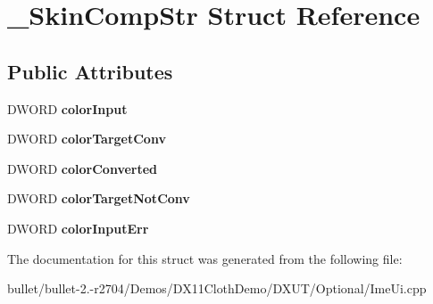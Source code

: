 \hypertarget{struct___skin_comp_str}{\section{\+\_\+\+Skin\+Comp\+Str Struct Reference}
\label{struct___skin_comp_str}
}
\subsection*{Public Attributes}
\begin{DoxyCompactItemize}
\item 
\hypertarget{struct___skin_comp_str_a329b3e3f5517a6d59e46ddea35e6174a}{D\+W\+O\+R\+D {\bfseries color\+Input}}\label{struct___skin_comp_str_a329b3e3f5517a6d59e46ddea35e6174a}

\item 
\hypertarget{struct___skin_comp_str_aa6aab6d6eb5106400d21ad0cf77f6399}{D\+W\+O\+R\+D {\bfseries color\+Target\+Conv}}\label{struct___skin_comp_str_aa6aab6d6eb5106400d21ad0cf77f6399}

\item 
\hypertarget{struct___skin_comp_str_a206bf9f56ec4c63506a61ef1cd640ecb}{D\+W\+O\+R\+D {\bfseries color\+Converted}}\label{struct___skin_comp_str_a206bf9f56ec4c63506a61ef1cd640ecb}

\item 
\hypertarget{struct___skin_comp_str_a8f57e646fcd03915f3b9af65a66c41a3}{D\+W\+O\+R\+D {\bfseries color\+Target\+Not\+Conv}}\label{struct___skin_comp_str_a8f57e646fcd03915f3b9af65a66c41a3}

\item 
\hypertarget{struct___skin_comp_str_a7112d201c275559375084f9529a743e3}{D\+W\+O\+R\+D {\bfseries color\+Input\+Err}}\label{struct___skin_comp_str_a7112d201c275559375084f9529a743e3}

\end{DoxyCompactItemize}


The documentation for this struct was generated from the following file\+:\begin{DoxyCompactItemize}
\item 
bullet/bullet-\/2.-\/r2704/\+Demos/\+D\+X11\+Cloth\+Demo/\+D\+X\+U\+T/\+Optional/Ime\+Ui.\+cpp\end{DoxyCompactItemize}
